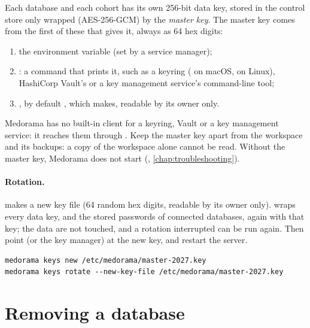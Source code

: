Each database and each cohort has its own 256-bit data key, stored in the control store only
wrapped (AES-256-GCM) by the \emph{master key}. The master key comes from the first of these
that gives it, always as 64 hex digits:
\begin{enumerate}
\item the environment variable  (set by a service manager);
\item {}: a command that prints it, such as a keyring
  ( on macOS,  on
  Linux), HashiCorp Vault's or a key management service's command-line tool;
\item {}, by default , which  makes,
  readable by its owner only.
\end{enumerate}
Medorama has no built-in client for a keyring, Vault or a key management service: it reaches
them through . Keep the master key apart from the workspace and its
backups: a copy of the workspace alone cannot be read. Without the master key, Medorama does not
start (, \cref{chap:troubleshooting}).

\paragraph{Rotation.}  makes a new key file (64 random hex digits,
readable by its owner only).  wraps every data
key, and the stored passwords of connected databases, again with that key; the data are not
touched, and a rotation interrupted can be run again. Then point  (or the
key manager) at the new key, and restart the server.
\begin{lstlisting}[style=shell]
medorama keys new /etc/medorama/master-2027.key
medorama keys rotate --new-key-file /etc/medorama/master-2027.key
\end{lstlisting}

\section{Removing a database}
\label{sec:administration-removing}

